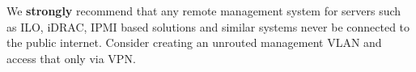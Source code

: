 

We \textbf{strongly} recommend that any remote management system for servers such as ILO, iDRAC, IPMI based solutions and similar systems never be connected to the public internet.
Consider creating an unrouted management VLAN and access that only via VPN.
